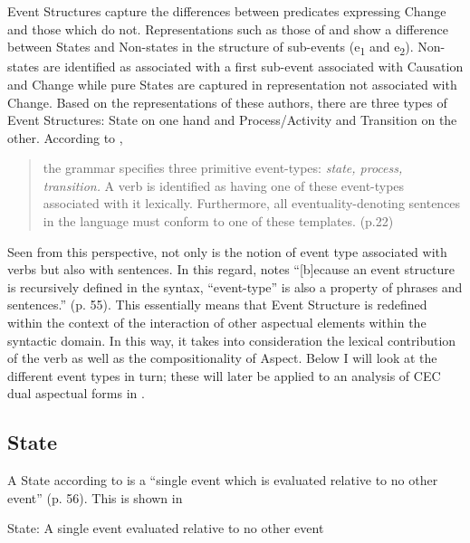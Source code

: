 Event Structures capture the differences between predicates expressing
Change and those which do not.  Representations such as those of
\citet{Pustejovsky1988,Pustejovsky1991} and \citet{Grimshaw1990} show
a difference between States and Non-states in the structure of
sub-events (e\textsubscript{1} and e\textsubscript{2}).  Non-states
are identified as associated with a first sub-event associated with
Causation and Change while pure States are captured in representation
not associated with Change.  Based on the representations of these
authors, there are three types of Event Structures: State on one hand
and Process\slash Activity and Transition on the other.  According to
\citet{Pustejovsky1988},

\begin{quote}
the grammar specifies three primitive event-types: \textit{state,
  process, transition.}  A verb is identified as having one of these
event-types associated with it lexically.  Furthermore, all
eventuality-denoting sentences in the language must conform to one of
these templates. (p.22)
\end{quote}

Seen from this perspective, not only is the notion of event type
associated with verbs but also with sentences.  In this regard,
\citet{Pustejovsky1991} notes “[b]ecause an event structure is
recursively defined in the syntax, “event-type” is also a property of
phrases and sentences.” (p. 55).  This essentially means that Event
Structure is redefined within the context of the interaction of other
aspectual elements within the syntactic domain.  In this way, it takes
into consideration the lexical contribution of the verb as well as the
compositionality of Aspect.  Below I will look at the different event
types in turn; these will later be applied to an analysis of CEC dual
aspectual forms in .

\subsection{State}\label{sec:4.2.2}

A State according to \citet{Pustejovsky1991} is a “single event which
is evaluated relative to no other event” (p. 56).  This is shown in

\ea%
\label{ex:4:5}
State: A single event evaluated relative to no other event \citep[56]{Pustejovsky1991}
\begin{center}\fbox{\parbox{3cm}{\centering
\begin{forest} [S [e]] \end{forest}
}} 
\end{center}\z

